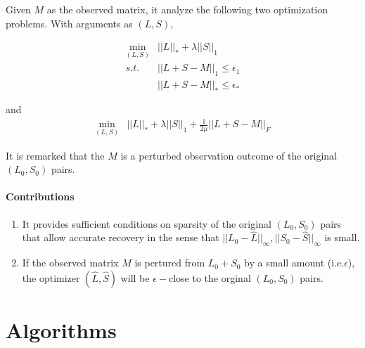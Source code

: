 \documentclass{../../common/projectreport}
\begin{document}
Given $M$ as the observed matrix, it analyze the following two optimization problems. With arguments as $(L,S)$,

\begin{eqnarray}
\min_{(L,S)} & ||L||_{*}+\lambda||S||_{1}\nonumber \\
s.t. & ||L+S-M||_{1}\le\epsilon_{1}\\
 & ||L+S-M||_{*}\le\epsilon_{*}\nonumber
\end{eqnarray}


and
\begin{eqnarray}
\min_{(L,S)} & ||L||_{*}+\lambda||S||_{1}+\frac{1}{2\mu}||L+S-M||_{F}
\end{eqnarray}


It is remarked that the $M$ is a perturbed observation outcome of the original $(L_{0},S_{0})$ pairs.


\subsubsection{Contributions}
\begin{enumerate}
\item It provides sufficient conditions on sparsity of the original $(L_{0},S_{0})$ pairs that allow accurate recovery in the sense that $||L_{0}-\hat{L}||_{\infty},||S_{0}-\hat{S}||_{\infty}$ is small.
\item If the observed matrix $M$ is pertured from $L_{0}+S_{0}$ by a small amount (i.e.$\epsilon$), the optimizer $(\hat{L}, \hat{S})$ will be $\epsilon-$close to the orginal $(L_{0},S_{0})$ pairs.
\end{enumerate}






\chapter{Algorithms}

\end{document}
